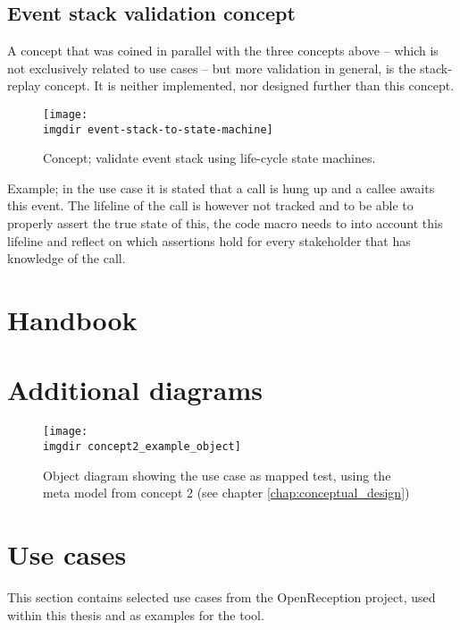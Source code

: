 \section{Event stack validation concept}
\label{appendix:event-stack-validation}
A concept that was coined in parallel with the three concepts above -- which is not exclusively related to use cases -- but more validation in general, is the stack-replay concept. It is neither implemented, nor designed further than this concept.
\begin{figure}[ht]
\centering
\texttt{[image: \\imgdir event-stack-to-state-machine]}
\caption{Concept; validate event stack using life-cycle state machines.}
\label{fig:event-stack-to-state-machine}
\end{figure}
Example; in the use case it is stated that a call is hung up and a callee awaits this event. The lifeline of the call is however not tracked and to be able to properly assert the true state of this, the code macro needs to into account this lifeline and reflect on which assertions hold for every stakeholder that has knowledge of the call. %





\chapter{Handbook}

\chapter{Additional diagrams}

\begin{figure}[!htbp]
  \centering
  \texttt{[image: \\imgdir concept2\_example\_object]}
  \caption{Object diagram showing the use case as mapped test, using the meta model from concept 2 (see chapter \ref{chap:conceptual_design})}
  \label{fig:concept2_example_object}
\end{figure}

\chapter{Use cases}
\label{appendix:use-cases}
This section contains selected use cases from the OpenReception project, used within this thesis and as examples for the tool.


